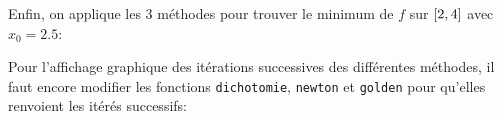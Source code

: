 {\begin{td-sol}
\begin{enumerate}
            Enfin, on applique les 3 méthodes pour trouver le minimum de \(f\) sur \(\mathopen{}\left[2,4\right]\mathclose{}\) avec \(x_0 = 2.5\):

            \vspace{5pt}
            \begin{minipage}{\textwidth}
                \centering
            \end{minipage}
            \vspace{5pt}
            
            Pour l'affichage graphique des itérations successives des différentes méthodes, 
            il faut encore modifier les fonctions \texttt{dichotomie}, \texttt{newton} et \texttt{golden}
            pour qu'elles renvoient les itérés successifs:
            

\end{enumerate}
\end{td-sol}}
